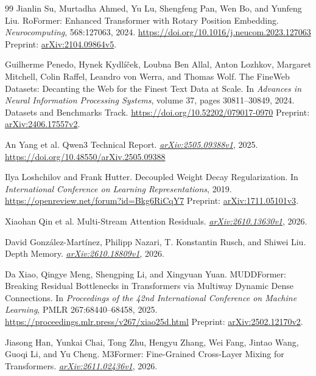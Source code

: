 \documentclass[11pt,letterpaper]{article}
\begin{document}
\begin{thebibliography}{99}
Jianlin Su, Murtadha Ahmed, Yu Lu, Shengfeng Pan, Wen Bo, and Yunfeng Liu.
\newblock RoFormer: Enhanced Transformer with Rotary Position Embedding.
\newblock \emph{Neurocomputing}, 568:127063, 2024.
\newblock \url{https://doi.org/10.1016/j.neucom.2023.127063}
\newblock Preprint: \href{https://arxiv.org/abs/2104.09864v5}{arXiv:2104.09864v5}.

Guilherme Penedo, Hynek Kydl{\'i}{\v c}ek, Loubna Ben Allal, Anton Lozhkov, Margaret Mitchell, Colin Raffel, Leandro von Werra, and Thomas Wolf.
\newblock The FineWeb Datasets: Decanting the Web for the Finest Text Data at Scale.
\newblock In \emph{Advances in Neural Information Processing Systems}, volume 37, pages 30811--30849, 2024. Datasets and Benchmarks Track.
\newblock \url{https://doi.org/10.52202/079017-0970}
\newblock Preprint: \href{https://arxiv.org/abs/2406.17557v2}{arXiv:2406.17557v2}.

An Yang et al.
\newblock Qwen3 Technical Report.
\newblock \href{https://arxiv.org/abs/2505.09388v1}{\emph{arXiv:2505.09388v1}}, 2025.
\newblock \url{https://doi.org/10.48550/arXiv.2505.09388}

Ilya Loshchilov and Frank Hutter.
\newblock Decoupled Weight Decay Regularization.
\newblock In \emph{International Conference on Learning Representations}, 2019.
\newblock \url{https://openreview.net/forum?id=Bkg6RiCqY7}
\newblock Preprint: \href{https://arxiv.org/abs/1711.05101v3}{arXiv:1711.05101v3}.

Xiaohan Qin et al.
\newblock Multi-Stream Attention Residuals.
\newblock \href{https://arxiv.org/abs/2610.13630v1}{\emph{arXiv:2610.13630v1}}, 2026.

David Gonz{\'a}lez-Mart{\'i}nez, Philipp Nazari, T. Konstantin Rusch, and Shiwei Liu.
\newblock Depth Memory.
\newblock \href{https://arxiv.org/abs/2610.18809v1}{\emph{arXiv:2610.18809v1}}, 2026.

Da Xiao, Qingye Meng, Shengping Li, and Xingyuan Yuan.
\newblock MUDDFormer: Breaking Residual Bottlenecks in Transformers via Multiway Dynamic Dense Connections.
\newblock In \emph{Proceedings of the 42nd International Conference on Machine Learning}, PMLR 267:68440--68458, 2025.
\newblock \url{https://proceedings.mlr.press/v267/xiao25d.html}
\newblock Preprint: \href{https://arxiv.org/abs/2502.12170v2}{arXiv:2502.12170v2}.

Jiasong Han, Yunkai Chai, Tong Zhu, Hengyu Zhang, Wei Fang, Jintao Wang, Guoqi Li, and Yu Cheng.
\newblock M3Former: Fine-Grained Cross-Layer Mixing for Transformers.
\newblock \href{https://arxiv.org/abs/2611.02436v1}{\emph{arXiv:2611.02436v1}}, 2026.


\end{thebibliography}
\end{document}
